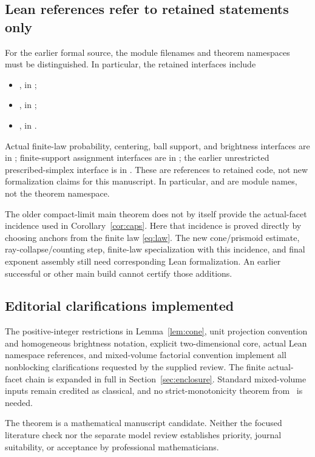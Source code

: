 \subsection{Lean references refer to retained statements only}
For the earlier formal source, the module filenames and theorem namespaces
must be distinguished. In particular, the retained interfaces include
\begin{itemize}[leftmargin=1.5em]
\item {}, in
;
\item {}, in
;
\item {}, in
.
\end{itemize}
Actual finite-law probability, centering, ball support, and brightness
interfaces are in ;
finite-support assignment interfaces are in
; the earlier
unrestricted prescribed-simplex interface is in
.
These are references to retained code, not new formalization claims for
this manuscript. In particular,  and
 are module names, not the theorem namespace.

The older compact-limit main theorem does not by itself provide the
actual-facet incidence used in Corollary~\ref{cor:caps}. Here that incidence
is proved directly by choosing anchors from the finite law
\eqref{eq:law}. The new cone/prismoid estimate, ray-collapse/counting step,
finite-law specialization with this incidence, and final exponent assembly
still need corresponding Lean formalization. An earlier successful
 or other main build cannot certify those additions.

\subsection{Editorial clarifications implemented}
The positive-integer restrictions in Lemma~\ref{lem:cone}, unit projection
convention and homogeneous brightness notation, explicit two-dimensional
core, actual Lean namespace references, and mixed-volume factorial
convention implement all nonblocking clarifications requested by the
supplied review. The finite actual-facet chain is expanded in full in
Section~\ref{sec:enclosure}. Standard mixed-volume inputs remain credited
as classical, and no strict-monotonicity theorem from~\cite{BS} is needed.

The theorem is a mathematical manuscript candidate. Neither the focused
literature check nor the separate model review establishes priority,
journal suitability, or acceptance by professional mathematicians.
